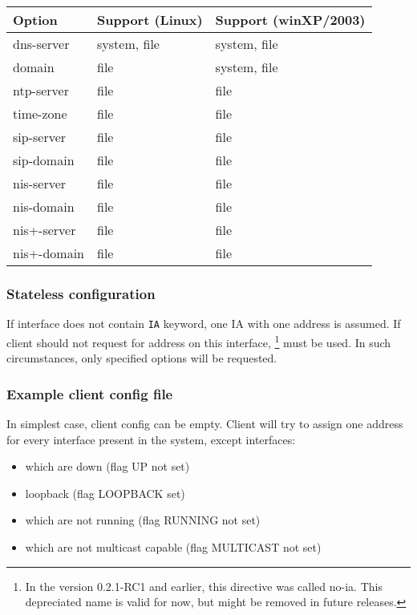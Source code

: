 \begin{center}
\begin{tabular}{|l|l|l|}
\hline
Option & Support (Linux) & Support (winXP/2003)  \\
\hline
dns-server  & system, file & system, file \\
domain      & file         & system, file \\
ntp-server  & file         & file \\
time-zone   & file         & file \\
sip-server  & file         & file \\
sip-domain  & file         & file \\
nis-server  & file         & file \\
nis-domain  & file         & file \\
nis+-server & file         & file \\
nis+-domain & file         & file \\
\hline
\end{tabular}
\end{center}

\subsubsection{Stateless configuration}

If interface does not contain \verb+IA+ keyword, one IA with one address is
assumed. If client should not request for address on this interface,
\footnote{In the version 0.2.1-RC1 and earlier, this
  directive was called no-ia. This depreciated name is valid for now,
  but might be removed in future releases.}
must be used. In such circumstances, only specified options will be
requested.

\subsubsection{Example client config file}

In simplest case, client config can be empty. Client will try to
assign one address for every interface present in the system, except
interfaces:
\begin{itemize}
\item which are down (flag UP not set)
\item loopback (flag LOOPBACK set)
\item which are not running (flag RUNNING not set)
\item which are not multicast capable (flag MULTICAST not set)
\end{itemize}

